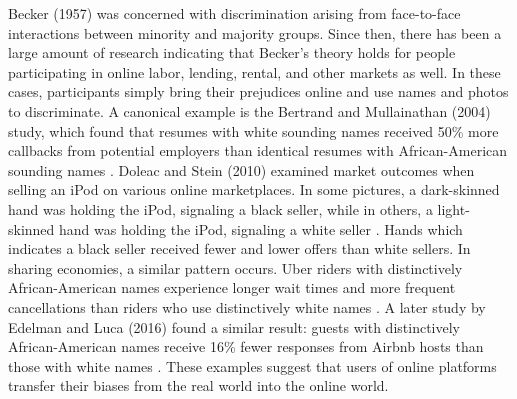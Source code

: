 Becker (1957) was concerned with discrimination arising from face-to-face interactions between minority and majority groups. Since then, there has been a large amount of research indicating that Becker's theory holds for people participating in online labor, lending, rental, and other markets as well. In these cases, participants simply bring their prejudices online and use names and photos to discriminate. A canonical example is the Bertrand and Mullainathan (2004) study, which found that resumes with white sounding names received 50\% more callbacks from potential employers than identical resumes with African-American sounding names \citep{bertrand}. Doleac and Stein (2010) examined market outcomes when selling an iPod on various online marketplaces. In some pictures, a dark-skinned hand was holding the iPod, signaling a black seller, while in others, a light-skinned hand was holding the iPod, signaling a white seller \citep{doleac}. Hands which indicates a black seller received fewer and lower offers than white sellers. In sharing economies, a similar pattern occurs. Uber riders with distinctively African-American names experience longer wait times and more frequent cancellations than riders who use distinctively white names \citep{knittel}. A later study by Edelman and Luca (2016) found a similar result: guests with distinctively African-American names receive 16\% fewer responses from Airbnb hosts than those with white names \citep{edelman2}. These examples suggest that users of online platforms transfer their biases from the real world into the online world.  

